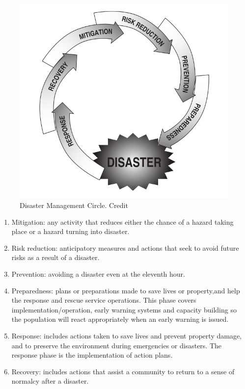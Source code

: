 \begin{figure}[h]
  \centering
  \includegraphics[width=1\textwidth]{img/background/drCircle}
  \caption{Disaster Management Circle. Credit \cite{Wattegama2012}}
  \label{fig:drCircle}
\end{figure}

\begin{enumerate}
\item Mitigation: any activity that reduces either the chance of a hazard taking place or a hazard turning into disaster.
\item Risk reduction: anticipatory measures and actions that seek to avoid future risks as a result of a disaster.
\item Prevention: avoiding a disaster even at the eleventh hour. 
\item Preparedness: plans or preparations made to save lives or property,and help the response and rescue service operations. This phase covers implementation/operation, early warning systems and capacity building so the population will react appropriately when an early warning is issued.
\item Response: includes actions taken to save lives and prevent property damage, and to preserve the environment during emergencies or disasters. The response phase is the implementation of action plans.
\item Recovery: includes actions that assist a community to return to a sense of normalcy after a disaster.
\end{enumerate}

